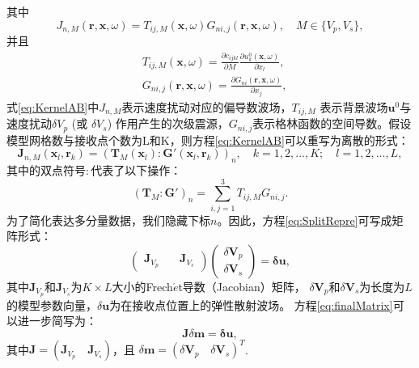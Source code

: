 其中
\begin{equation}
        J_{n,M}(\mathbf{r,x},\omega)=
        T_{ij,M}(\mathbf{x},\omega)G_{ni,j}(\mathbf{r,x},\omega), \quad M\in\{V_p,V_s\},
\label{eq:KernelAB}
\end{equation}
并且
\begin{equation}
\begin{split}
                &T_{ij,M}(\mathbf{x},\omega)=\frac{\partial c_{ijkl}}{\partial M}\frac{\partial
                        u^0_{k}(\mathbf{x},\omega)}{\partial x_l},\\ 
                        &G_{ni,j}(\mathbf{r,x},\omega)=\frac{\partial
                                G_{ni}(\mathbf{r},\mathbf{x},\omega)}{\partial x_j},
\end{split}
\label{eq:traction}
\end{equation}
式\eqref{eq:KernelAB}中$J_{n,M}$表示速度扰动对应的偏导数波场\cite[]{pratt1998gauss}，$T_{ij,M}$
表示背景波场$\mathbf{u}^0$与速度扰动$\delta V_p$ (或 $\delta V_s$)
作用产生的次级震源，$G_{ni,j}$表示格林函数的空间导数。假设模型网格数与接收点个数为L和K，则方程\eqref{eq:KernelAB}可以重写为离散的形式：
\begin{equation}
        \mathbf{J}_{n,M}(\mathbf{x}_l,\mathbf{r}_k)=
        (\mathbf{T}_M(\mathbf{x}_l):\mathbf{G}'(\mathbf{x}_l,\mathbf{r}_k))_n,\quad
        k=1,2,...,K;\quad l=1, 2,...,L,
        \label{eq:EquivFre}
\end{equation}
其中的双点符号$:$代表了以下操作：
\begin{equation}
    (\mathbf{T}_M:\mathbf{G}')_{n}=\sum_{i,j=1}^{3}T_{ij,M}G_{ni,j}.
    \label{eq:contraction}
\end{equation}
为了简化表达多分量数据，我们隐藏下标$n$。因此，方程\eqref{eq:SplitRepre}可写成矩阵形式：
\begin{equation}
            \begin{pmatrix}
                        \mathbf{J}_{V_p}&\quad\mathbf{J}_{V_s}
    \end{pmatrix}
    \begin{pmatrix}
       \delta  \mathbf{V}_p\\
       \delta \mathbf{V}_s
    \end{pmatrix}
    =
        \mathbf{\delta u},
        \label{eq:finalMatrix}
\end{equation}
其中$\mathbf{J}_{V_p}$和$\mathbf{J}_{V_s}$为$K\times L$大小的Frech{$\acute{e}$}t导数（Jacobian）矩阵，
$\delta \mathbf{V}_p$和$\delta \mathbf{V}_s$为长度为$L$的模型参数向量，$\delta \mathbf{u}$为在接收点位置上的弹性散射波场。
方程\eqref{eq:finalMatrix}可以进一步简写为：
\begin{equation}
        \mathbf{J}\delta \mathbf{m}
    =
        \mathbf{\delta u},
        \label{eq:finalMatrixshort}
\end{equation}
其中$\mathbf{J}=(\mathbf{J}_{V_p}\quad\mathbf{J}_{V_s})$，且 
$\delta \mathbf{m}=(\delta\mathbf{V}_p \quad \delta\mathbf{V}_s)^T$.


